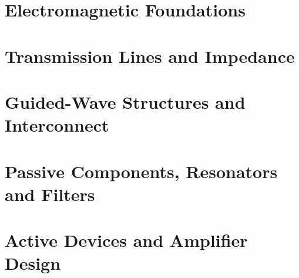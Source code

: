 
\chapter{Electromagnetic Foundations}







\chapter{Transmission Lines and Impedance}










\chapter{Guided-Wave Structures and Interconnect}








\chapter{Passive Components, Resonators and Filters}













\chapter{Active Devices and Amplifier Design}












